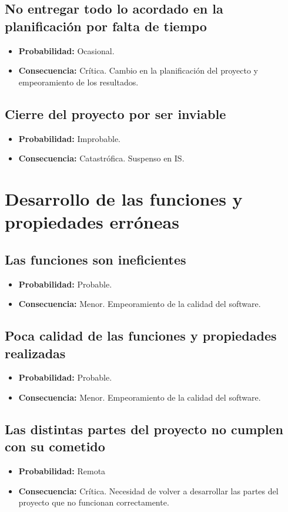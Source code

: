\documentclass[spanish,a4paper,12pt]{report}	%
\begin{document}
\subsection*{No entregar todo lo acordado en la planificación por falta de tiempo}
	\begin{itemize}
		\item \textbf {Probabilidad: }Ocasional.
		\item \textbf {Consecuencia: }Crítica. Cambio en la planificación del proyecto y empeoramiento de los resultados.
	\end{itemize}

\subsection*{Cierre del proyecto por ser inviable}
	\begin{itemize}
		\item \textbf {Probabilidad: }Improbable.
		\item \textbf {Consecuencia: }Catastrófica. Suspenso en IS.
	\end{itemize}

%
\section{Desarrollo de las funciones y propiedades erróneas}

\subsection*{Las funciones son ineficientes}
	\begin{itemize}
		\item \textbf {Probabilidad: }Probable.
		\item \textbf {Consecuencia: }Menor. Empeoramiento de la calidad del software.
	\end{itemize}

\subsection*{Poca calidad de las funciones y propiedades realizadas}
	\begin{itemize}
		\item \textbf {Probabilidad: }Probable.
		\item \textbf {Consecuencia: }Menor. Empeoramiento de la calidad del software.
	\end{itemize}

\subsection*{Las distintas partes del proyecto no cumplen con su cometido}
	\begin{itemize}
		\item \textbf {Probabilidad: }Remota
		\item \textbf {Consecuencia: }Crítica. Necesidad de volver a desarrollar las partes del proyecto que no funcionan correctamente.
	\end{itemize}
\end{document}
